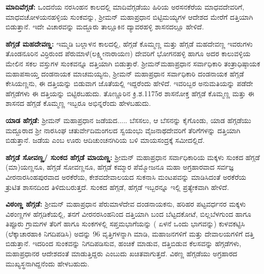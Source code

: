 \textbf{ಮಾದಿವೆಗ್ಗಡೆ:} ಒಂದನೆಯ ನರಸಿಂಹನ ಕಾಲದಲ್ಲಿ ಮಾದಿವೆಗ್ಗಡೆಯು ಹಿರಿಯ ಅರಸನಕೆರೆಯ ಮಾಧವದೇವರಿಗೆ, ಮಾಧವಚೋಳಯನಹಳ್ಳಿಯ ಸುಂಕವನ್ನು, ಶ‍್ರೀಮನ್​ ಮಹಾಪ್ರಧಾನ ಬಿಟ್ಟಿಮಯ್ಯಗಳ ಆದೇಶದ ಮೇರೆಗೆ ದತ್ತಿಯಾಗಿ ಬಿಡುತ್ತಾನೆ. ಇದೇ ವಿಚಾರವನ್ನು ಮದ್ದೂರು ತಾಲ್ಲೂಕಿನ ದ್ಯಾವರಹಳ್ಳಿ ಶಾಸನದಲ್ಲೂ ಹೇಳಿದೆ.

\textbf{ಹೆಗ್ಗಡೆ ಮಹದೇವಣ್ಣ:} ಇಮ್ಮಡಿ ಬಲ್ಲಾಳನ ಕಾಲದಲ್ಲಿ, ಹೆಗ್ಗಡೆ ಕೊಮ್ಮಣ್ಣ ಮತ್ತು ಹೆಗ್ಗಡೆ ಮಹದೇವಣ್ಣ ಇವರುಗಳು ತೊಂಡನೂರಿನ ವಿರ್ರಿರುಂದ ಪೆರುಮಾಳೆ(ಲಕ್ಷ್ಮೀನಾರಾಯಣ) ದೇವರಿಗೆ ಭೋಗನಹಳ್ಳಿ ಹಾಗೂ ಅದರ ಕಾಲುವಳ್ಳಿಯ ಮೇಲಿನ ಸಕಲ ವಸ್ತುಗಳ ಸುಂಕವನ್ನೂ ದತ್ತಿಯಾಗಿ ಬಿಡುತ್ತಾರೆ. ಶ‍್ರೀಮನ್​ ಮಹಾಪ್ರಧಾನ ಸರ್ವಾಧಿಕಾರಿ ತಂತ್ರಾಧಿಷ್ಠಾಯಕ ಮಹಾಪಸಾಯ್ತ ದಂಡನಾಯಕ ಮಾಚಮಯ್ಯನು, ಶ‍್ರೀಮನ್​ ಮಹಾಪ್ರಧಾನ ಸರ್ವಾಧಿಕಾರಿ ದಂಡನಾಯಕ ಹೆಗ್ಗಡೆ ಕೇಸಿಯಣ್ಣನು, ಈ ದತ್ತಿಯನ್ನು ಬಿಡುವಾಗ ಜೊತೆಯಲ್ಲಿ ಇದ್ದರೆಂದು ಹೇಳಿದೆ. ಇವರಿಬ್ಬರ ಅನುಮತಿಯನ್ನು ಪಡೆದೇ ಹೆಗ್ಗಡೆಗಳು ಈ ದತ್ತಿಯನ್ನು ಬಿಟ್ಟಿರಬಹುದು. ತೊಣ್ಣೂರಿನ ಕ್ರಿ.ಶ.1175ರ ಶಾಸನೋಕ್ತ ಹೆಗ್ಗಡೆ ಕೊಮ್ಮಣ್ಣ ಮತ್ತು ಈ ಶಾಸನದ ಹೆಗ್ಗಡೆ ಕೊಮ್ಮಣ್ಣ ಇಬ್ಬರೂ ಅಭಿನ್ನರೆಂದು ಹೇಳಬಹುದು.

\vskip -1pt

\textbf{ಯಾಡ ಹೆಗ್ಗಡೆ:} ಶ‍್ರೀಮನ್​ ಮಹಾಪ್ರಧಾನ ಜಡೆಯದ..... ಬೆಸಸಲು, ಆ ಬೆಸನನ್ನು ಕೈಗೊಂಡು, ಯಾಡ ಹೆಗ್ಗಡೆಯು ಮದ್ದೂರಾದ ಶ‍್ರೀ ನಾರಸಿಂಘ ಚತುರ್ವೇದಿಮಂಗಲದ ಸ್ವಯಂಭು ವೈಜನಾಥದೇವರಿಗೆ ತೆರಿಗೆಗಳನ್ನು ದತ್ತಿಯಾಗಿ ಬಿಡುತ್ತಾನೆ. ಜಡೆಯ ಎಂಬ ಊರು ಆದಿಚುಂಚನಗಿರಿಯ ಬಳಿ ಮಾಯಸಂದ್ರಕ್ಕೆ ಸಮೀದಲ್ಲಿದೆ.

\vskip -1pt

\textbf{ಹೆಗ್ಗಡೆ ಸೋವಣ್ಣ/ ಸುಂಕದ ಹೆಗ್ಗಡೆ ಮಾಯಣ್ಣ:} ಶ‍್ರೀಮನ್​ ಮಹಾಪ್ರಧಾನ ಸರ್ವಾಧಿಕಾರಿಯ ಮಕ್ಕಳು ಸುಂಕದ ಹೆಗ್ಗಡೆ (ಮಾ)ಯಣ್ಣನೂ, ಹೆಗ್ಗಡೆ ಸೋವಣ್ಣನೂ, ಹೆಗ್ಗಡೆ ಕಮ್ಮಾರ ಪೆಮ್ಮೋಜನೂ ಮಹಾ ಅಗ್ರಹಾರವಾದ ಸರ್ವಜ್ಞ ವೀರನಾರಸಿಂಹಪುರ\-ವಾದ ಅರಕೆರೆಯ, ಕೇಶವದೇವಾಲಯದ ಸುಕನಾಸಿ ಮಂಟಪವನ್ನು ಮಾಡಿಸಿದಂತೆ ಅರಕೆರೆಯ ತ್ರುಟಿತ ಶಾಸನದಿಂದ ತಿಳಿದುಬರುತ್ತದೆ. ಸುಂಕದ ಹೆಗ್ಗಡೆ, ಹೆಗ್ಗಡೆ ಇಬ್ಬರನ್ನೂ ಇಲ್ಲಿ ಪ್ರತ್ಯೇಕವಾಗಿ ಹೇಳಿದೆ.

\vskip -1pt

\textbf{ವಿಠಂಣ್ಣ ಹೆಗ್ಗಡೆ:} ಶ‍್ರೀಮನ್​ ಮಹಾಪ್ರಧಾನ ಪೆರುಮಾಳೆದೇವ ದಂಡನಾಯಕನು, ಹರಿಹರ ಪಟ್ಟವರ್ಧನರ ಮಕ್ಕಳು ವಿಠಂಣ್ಣಗಳ ಹೆಗ್ಗಡಿಕೆಯಲ್ಲಿ, ತನಗೆ ವೀರನರಸಿಂಹನಿಂದ ದತ್ತಿಯಾಗಿ ಬಂದ ಬೆಟ್ಟದಕೋಟೆ, ಬಿಲ್ಲಬೆಳಗುಂದ ಹಾಗೂ ತಿಪ್ಪೂರು ಗ್ರಾಮಗಳ ತೆರಿಗೆ ಹಾಗೂ ಸುಂಕಗಳಲ್ಲಿ ಸಪ್ತಮಭಾಗೆಯನ್ನು ( ಏಳನೆ ಒಂದು ಭಾಗವನ್ನು) ಕುಳವಕಟ್ಟಿಸಿ (ಲೆಕ್ಕಾಚಾರಹಾಕಿ ನಿಗದಿಪಡಿಸಿ) ಅದನ್ನು 96 ವೃತ್ತಿಗಳನ್ನಾಗಿ ಮಾಡಿ, ಮಹಾಜನಗಳಿಗೆ ಮತ್ತು ದೇವಾಲಯಗಳಿಗೆ ದತ್ತಿ ಬಿಡುತ್ತಾನೆ. ಇದರಿಂದ ಸುಂಕವನ್ನು ನಿಗದಿಪಡಿಸುವ, ಹಂಚಿಕೆ ಮಾಡುವ, ದತ್ತಿಬಿಡುವ ಕೆಲಸವನ್ನು ಹೆಗ್ಗಡೆಗಳು, ಮಹಾಪ್ರಧಾನರ ಆದೇಶದಂತೆ ಮಾಡುತ್ತಿದ್ದರು ಎಂಬುದು ಖಚಿತವಾಗುತ್ತದೆ. ವಿಠಣ್ಣ ಹೆಗ್ಗಡೆಯು ಅಗ್ರಹಾರದ ಮುಖ್ಯಸ್ಥ\-ನಾಗಿದ್ದನೆಂದು ಹೇಳಬಹುದು.

